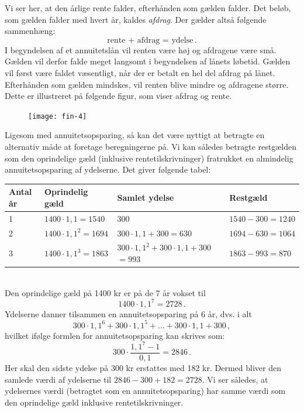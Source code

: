 \documentclass[12pt,oneside,a4paper]{article}
\begin{document}
Vi ser her, at den årlige rente falder, efterhånden som gælden falder. Det
beløb, som gælden falder med hvert år, kaldes \emph{afdrag}. Der gælder
altså følgende sammenhæng:
\[
\mbox{rente + afdrag = ydelse}\,.
\]
I begyndelsen af et annuitetslån vil renten være høj og afdragene være små.
Gælden vil derfor falde meget langsomt i begyndelsen af lånets løbetid.  Gælden
vil først være faldet væsentligt, når der er betalt en hel del afdrag på lånet.
Efterhånden som gælden mindskes, vil renten blive mindre og afdragene
større. Dette er illustreret på følgende figur, som viser afdrag og rente.
\begin{figure}[H]
    \centering
    \texttt{[image: fin-4]}
\end{figure}

Ligesom med annuitetsopsparing, så kan det være nyttigt at betragte en
alternativ måde at foretage beregningerne på.  Vi kan således betragte
restgælden som den oprindelige gæld (inklusive rentetilskrivninger) fratrukket
en almindelig annuitetsopsparing af ydelserne.  
Det giver følgende tabel:
\\

\noindent
\begin{tabular}{|l|l|p{4.5cm}|l|}
    \hline
    \textbf{Antal år} & \textbf{Oprindelig gæld} & \textbf{Samlet ydelse} & \textbf{Restgæld}\\
    \hline
    1 & $1400\cdot 1,1 = 1540$ & 300 & $1540 - 300 = 1240$ \\
    \hline
    2 & $1400\cdot 1,1^2 = 1694$ & $300\cdot 1,1 + 300 = 630$ & $1694 - 630 = 1064$ \\
    \hline
    3 & $1400\cdot 1,1^3 = 1863$ & $300\cdot 1,1^2 + 300\cdot 1,1 + 300$ \newline $= 993$ & $1863 - 993 = 870$ \\
    \hline
\end{tabular}
\\

Den oprindelige gæld på 1400 kr er på de 7 år vokset til 
\[
    1400 \cdot 1,1^7 = 2728 \,.
\]
Ydelserne danner tilsammen en annuitetsopsparing på 6 år, dvs. i alt
\[
    300 \cdot 1,1^6 + 300 \cdot 1,1^5 + \ldots + 300 \cdot 1,1 + 300 \,,
\]
hvilket ifølge formlen for annuitetsopsparing kan skrives som:
\[
    300 \cdot \frac{1,1^7 - 1}{0,1} = 2846 \,.
\]
Her skal den sidste ydelse på 300 kr erstattes med 182 kr. Dermed bliver den samlede værdi af
ydelserne til $2846 - 300 + 182 = 2728$.
Vi ser således, at ydelsernes værdi (betragtet som en annuitetsopsparing) har samme værdi
som den oprindelige gæld inklusive rentetilskrivninger.
\end{document}

